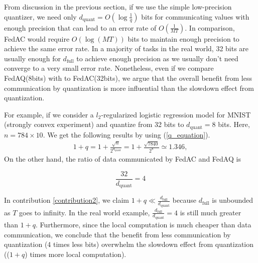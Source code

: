 From discussion in the previous section, if we use the simple low-precision quantizer, we need only $d_{\text{quant}} = O(\log \frac{1}{q})$ bits for communicating values with enough precision that can lead to an error rate of $O(\frac{1}{MT})$. In comparison, FedAC would require $O(\log (MT))$ bits to maintain enough precision to achieve the same error rate. In a majority of tasks in the real world, 32 bits are usually enough for $d_{\textrm{full}}$ to achieve enough precision as we usually don't need converge to a very small error rate. Nonetheless, even if we compare FedAQ(8bits) with to FedAC(32bits), we argue that the overall benefit from less communication by quantization is more influential than the slowdown effect from quantization.

For example, if we consider a $l_2$-regularized logistic regression model for MNIST (strongly convex experiment) and quantize from 32 bits to $d_{\text{quant}} = 8$ bits. Here, $n = 784 \times 10$. We get the following results by using (\ref{q_equation}).
\begin{align*} %
    1+q = 1+ \frac{\sqrt{n}}{2^{d_{\textrm{quant}}}} = 1+\frac{\sqrt{7840}}{2^8} \simeq 1.346, \textrm{}
\end{align*}
On the other hand, the ratio of data communicated by FedAC and FedAQ is

\begin{equation*}
    \frac{32}{d_{\textrm{quant}}} = 4
\end{equation*}

In contribution \ref{contribution2}, we claim $1+q \ll \frac{d_{\text{full}}}{d_{\text{quant}}}$ because $d_{\textrm{full}}$ is unbounded as $T$ goes to infinity. In the real world example, $\frac{d_{\text{full}}}{d_{\text{quant}}}=4$ is still much greater than $1+q$. Furthermore, since the local computation is much cheaper than data communication, we conclude that the benefit from less communication by quantization (4 times less bits) overwhelm the slowdown effect from quantization (($1+q$) times more local computation). 